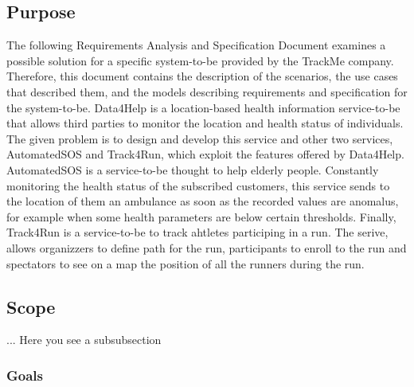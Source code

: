 \subsection{Purpose} 
The following Requirements Analysis and Specification Document examines a possible solution for a specific system-to-be provided by the TrackMe company. Therefore, this document contains the description of the scenarios, the use cases that described them, and the models describing requirements and specification for the system-to-be.
\bigbreak
\noindent
Data4Help is a location-based health information service-to-be that allows third parties to monitor the location and health status of individuals. The given problem is to design and develop this service and other two services, AutomatedSOS and Track4Run, which exploit the features offered by Data4Help.
\bigbreak
\noindent
AutomatedSOS is a service-to-be thought to help elderly people. Constantly monitoring the health status of the subscribed customers, this service sends to the location of them an ambulance as soon as the recorded values are anomalus, for example when some health parameters are below certain thresholds.
\bigbreak
\noindent
Finally, Track4Run is a service-to-be to track ahtletes participing in a run. The serive, allows organizzers to define path for the run, participants to enroll to the run and spectators to see on a map the position of all the runners during the run.
\subsection{Scope}
... Here you see a subsubsection
\subsubsection{Goals}

